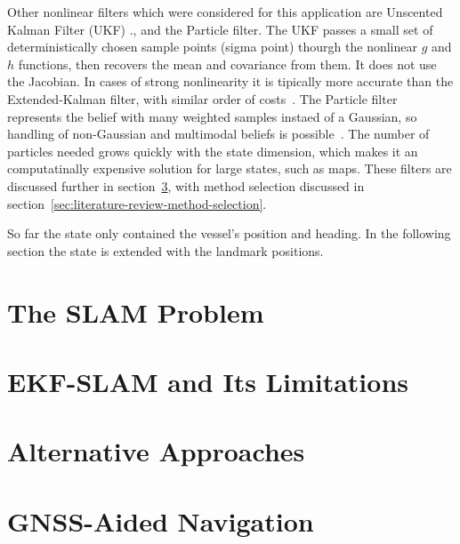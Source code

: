 Other nonlinear filters which were considered for this application are Unscented Kalman Filter (UKF) .,
and the Particle filter.
The UKF passes a small set of deterministically chosen sample points (sigma point)
thourgh the nonlinear $g$ and $h$ functions, then recovers the mean and covariance from them.
It does not use the Jacobian. In cases of strong nonlinearity it is tipically more accurate than
the Extended-Kalman filter, with similar order of costs~\citep{julier2004unscented}.
The Particle filter represents the belief with many weighted samples instaed of a
Gaussian, so handling of non-Gaussian and multimodal beliefs is possible~\citep{arulampalam2002tutorial, gordon1993novel}.
The number of particles needed grows quickly with the state dimension,
which makes it an computatinally expensive solution for large states, such as maps\citep{TODO}.
These filters are discussed further in section~\ref{sec:literature-review-alternative-approaches},
with method selection discussed in section~\ref{sec:literature-review-method-selection}.

So far the state only contained the vessel's position and heading. In the following section
the state is extended with the landmark positions.

\section{The SLAM Problem}
\label{sec:literature-review-slam-problem}

\section{EKF-SLAM and Its Limitations}
\label{sec:literature-review-ekf-slam-limitations}

\section{Alternative Approaches}
\label{sec:literature-review-alternative-approaches}

\section{GNSS-Aided Navigation}
\label{sec:literature-review-gnss-aided-navigation}

